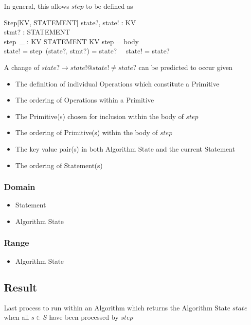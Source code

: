 \documentclass[../main.tex]{subfiles}
\begin{document}
In general, this allows $step$ to be defined as
\begin{schema}{Step[KV, STATEMENT]}
  state?, state! : KV \\
  stmt? : STATEMENT \\
  step~\_ : KV \cross STATEMENT \surj KV
  \where
  step = \langle body \rangle \\
  state! = step~(state?, stmt?) = state? ~\lor ~state! \not= state?
\end{schema}
A change of $state? \to state! @ state! \not= state?$ can be predicted to occur given
\begin{itemize}
\item The definition of individual Operations which constitute a Primitive
\item The ordering of Operations within a Primitive
\item The Primitive(s) chosen for inclusion within the body of $step$
\item The ordering of Primitive(s) within the body of $step$
\item The key value pair(s) in both Algorithm State and the current Statement
\item The ordering of Statement(s)
\end{itemize}

\subsubsection{Domain}

\begin{itemize}
\item Statement
\item Algorithm State
\end{itemize}

\subsubsection{Range}

\begin{itemize}
\item Algorithm State
\end{itemize}

\subsection{Result}

Last process to run within an Algorithm which returns the Algorithm State $state$
when all $s \in S$ have been processed by $step$
\end{document}
